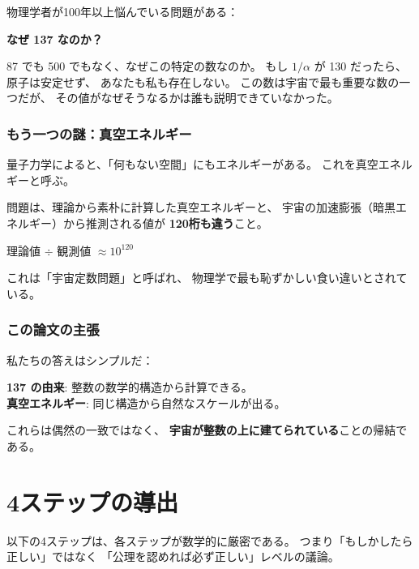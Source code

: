 \documentclass[11pt,a4paper]{article}
\begin{document}
物理学者が100年以上悩んでいる問題がある：

\begin{center}
\textbf{なぜ 137 なのか？}
\end{center}

87 でも 500 でもなく、なぜこの特定の数なのか。
もし $1/\alpha$ が 130 だったら、原子は安定せず、
あなたも私も存在しない。
この数は宇宙で最も重要な数の一つだが、
その値がなぜそうなるかは誰も説明できていなかった。

\section{もう一つの謎：真空エネルギー}

量子力学によると、「何もない空間」にもエネルギーがある。
これを真空エネルギーと呼ぶ。

問題は、理論から素朴に計算した真空エネルギーと、
宇宙の加速膨張（暗黒エネルギー）から推測される値が
\textbf{120桁も違う}こと。

\begin{center}
理論値 $\div$ 観測値 $\approx 10^{120}$
\end{center}

これは「宇宙定数問題」と呼ばれ、
物理学で最も恥ずかしい食い違いとされている。

\section{この論文の主張}

私たちの答えはシンプルだ：

\begin{resultbox}[二つの答え]
\textbf{137 の由来}: 整数の数学的構造から計算できる。\\
\textbf{真空エネルギー}: 同じ構造から自然なスケールが出る。

これらは偶然の一致ではなく、
\textbf{宇宙が整数の上に建てられている}ことの帰結である。
\end{resultbox}

\part{4ステップの導出}

以下の4ステップは、各ステップが数学的に厳密である。
つまり「もしかしたら正しい」ではなく
「公理を認めれば必ず正しい」レベルの議論。
\end{document}
